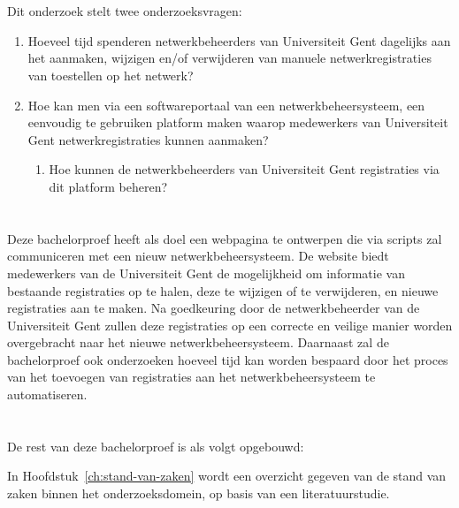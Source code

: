 \section{}%
\label{sec:onderzoeksvraag}
Dit onderzoek stelt twee onderzoeksvragen:
\begin{enumerate}
    \item Hoeveel tijd spenderen netwerkbeheerders van Universiteit Gent dagelijks aan het aanmaken, wijzigen en/of verwijderen van manuele netwerkregistraties van toestellen op het netwerk?
    \item Hoe kan men via een softwareportaal van een netwerkbeheersysteem, een eenvoudig te gebruiken platform maken waarop medewerkers van Universiteit Gent netwerkregistraties kunnen aanmaken?
    \begin{enumerate}
        \item Hoe kunnen de netwerkbeheerders van Universiteit Gent registraties via dit platform beheren?
    \end{enumerate}
\end{enumerate}

\section{}%
\label{sec:onderzoeksdoelstelling}
Deze bachelorproef heeft als doel een webpagina te ontwerpen die via scripts zal communiceren met een nieuw netwerkbeheersysteem. De website biedt medewerkers van de Universiteit Gent de mogelijkheid om informatie van bestaande registraties op te halen, deze te wijzigen of te verwijderen, en nieuwe registraties aan te maken. Na goedkeuring door de netwerkbeheerder van de Universiteit Gent zullen deze registraties op een correcte en veilige manier worden overgebracht naar het nieuwe netwerkbeheersysteem. Daarnaast zal de bachelorproef ook onderzoeken hoeveel tijd kan worden bespaard door het proces van het toevoegen van registraties aan het netwerkbeheersysteem te automatiseren.

\section{}%
\label{sec:opzet-bachelorproef}
De rest van deze bachelorproef is als volgt opgebouwd:

In Hoofdstuk~\ref{ch:stand-van-zaken} wordt een overzicht gegeven van de stand van zaken binnen het onderzoeksdomein, op basis van een literatuurstudie.


